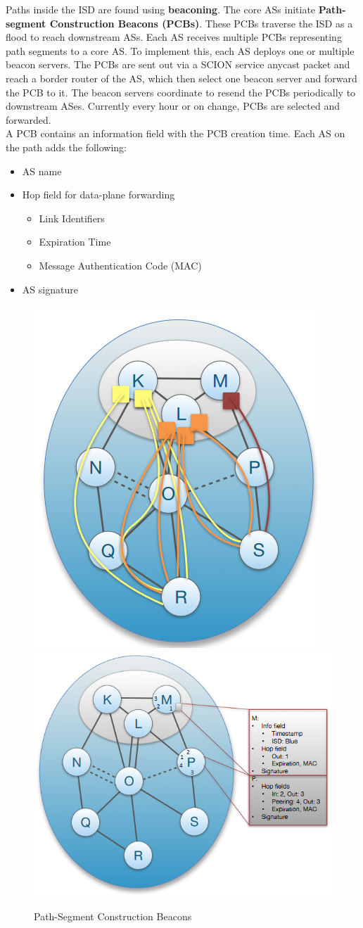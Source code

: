 Paths inside the ISD are found using \textbf{beaconing}. The core ASs initiate \textbf{Path-segment Construction Beacons (PCBs)}. These PCBs traverse the ISD as a flood to reach downstream ASs. Each AS receives multiple PCBs representing path segments to a core AS. To implement this, each AS deploys one or multiple beacon servers. The PCBs are sent out via a SCION service anycast packet and reach a border router of the AS, which then select one beacon server and forward the PCB to it. The beacon servers coordinate to resend the PCBs periodically to downstream ASes. Currently every hour or on change, PCBs are selected and forwarded.\\
A PCB contains an information field with the PCB creation time. Each AS on the path adds the following:
\begin{itemize}
\item AS name
\item Hop field for data-plane forwarding
\begin{itemize}
\item Link Identifiers
\item Expiration Time
\item Message Authentication Code (MAC) 
\end{itemize}
\item AS signature
\end{itemize}
\begin{figure}[h]
\centering
\includegraphics[width=.4\textwidth]{images/isd_path.PNG}
\includegraphics[width=.5\textwidth]{images/beaconing.PNG}
\label{beaconing}
\caption{Path-Segment Construction Beacons}
\end{figure}
